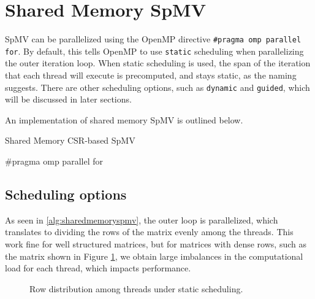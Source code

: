 \section{Shared Memory SpMV}
SpMV can be parallelized using the OpenMP directive \texttt{\#pragma omp parallel for}. By default, this tells OpenMP to use \texttt{static} scheduling when parallelizing the outer iteration loop. When static scheduling is used, the span of the iteration that each thread will execute is precomputed, and stays static, as the naming suggests. There are other scheduling options, such as \texttt{dynamic} and \texttt{guided}, which will be discussed in later sections.
\medskip

An implementation of shared memory SpMV is outlined below.
\medskip

\begin{algorithm}[H]
    \caption{Shared Memory CSR-based SpMV}
    \SetAlgoVlined

    \#pragma omp parallel for\\
    \label{alg:sharedmemoryspmv}
\end{algorithm}

\subsection{Scheduling options}
\label{sec:schedulingoptions}
As seen in \autoref{alg:sharedmemoryspmv}, the outer loop is parallelized, which translates to dividing the rows of the matrix evenly among the threads. This work fine for well structured matrices, but for matrices with dense rows, such as the matrix shown in Figure \ref{fig:staticscheduling}, we obtain large imbalances in the computational load for each thread, which impacts performance. 

\begin{figure}[H]
    \centering
    \caption{Row distribution among threads under static scheduling.}
    \label{fig:staticscheduling}
\end{figure}

